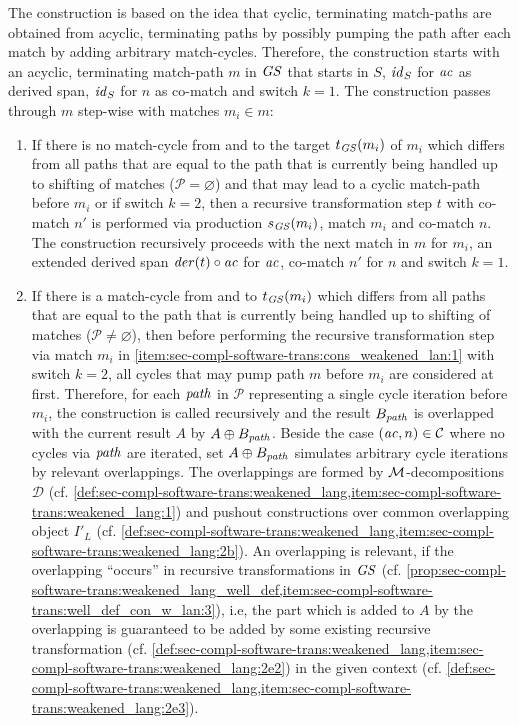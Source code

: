 \begin{remark}
\label{rem:sec-compl-software-trans:con_weakened_lang}
The construction is based on the idea that cyclic, terminating match-paths are obtained from acyclic, terminating paths by possibly pumping the path after each match by adding arbitrary match-cycles.
Therefore, the construction starts with an acyclic, terminating match-path $m$ in $\mathit{GS}$ that starts in $S$, $\mathit{id}_S$ for $\mathit{ac}$ as derived span, $\mathit{id}_S$ for $n$ as co-match and switch $k=1$.
The construction passes through $m$ step-wise with matches $m_i \in m$:
\begin{enumerate}
  \item \label{item:sec-compl-software-trans:cons_weakened_lan:1} If there is no match-cycle from and to the target $t_\mathit{GS}(m_i)$ of $m_i$ which differs from all paths that are equal to the path that is currently being handled up to shifting of matches ($\mathcal{P}=\varnothing$) and that may lead to a cyclic match-path before $m_i$ or if switch $k=2$, then a recursive transformation step $t$ with co-match $n'$ is performed via production $s_\mathit{GS}(m_i)$, match $m_i$ and co-match $n$.
  The construction recursively proceeds with the next match in $m$ for $m_i$, an extended derived span $\mathit{der}(t) \circ \mathit{ac}$ for $\mathit{ac}$, co-match $n'$ for $n$ and switch $k=1$.
  \item If there is a match-cycle from and to $t_\mathit{GS}(m_i)$ which differs from all paths that are equal to the path that is currently being handled up to shifting of matches ($\mathcal{P}\neq\varnothing$), then before performing the recursive transformation step via match $m_i$ in \cref{item:sec-compl-software-trans:cons_weakened_lan:1} with switch $k=2$, all cycles that may pump path $m$ before $m_i$ are considered at first.
  Therefore, for each $\mathit{path}$ in $\mathcal{P}$ representing a single cycle iteration before $m_i$, the construction is called recursively and the result $B_\mathit{path}$ is overlapped with the current result $A$ by $A \oplus B_\mathit{path}$.
  Beside the case $(\mathit{ac},n) \in \mathcal{C}$ where no cycles via $\mathit{path}$ are iterated, set $A \oplus B_\mathit{path}$ simulates arbitrary cycle iterations by relevant overlappings.
  The overlappings are formed by ${\cal M}$-decompositions $\mathcal{D}$ (cf. \cref{def:sec-compl-software-trans:weakened_lang,item:sec-compl-software-trans:weakened_lang:1}) and pushout constructions over common overlapping object $I'_L$ (cf. \cref{def:sec-compl-software-trans:weakened_lang,item:sec-compl-software-trans:weakened_lang:2b}).
  An overlapping is relevant, if the overlapping ``occurs'' in recursive transformations in $\mathit{GS}$ (cf. \cref{prop:sec-compl-software-trans:weakened_lang_well_def,item:sec-compl-software-trans:well_def_con_w_lan:3}), i.e, the part which is added to $A$ by the overlapping is guaranteed to be added by some existing recursive transformation (cf. \cref{def:sec-compl-software-trans:weakened_lang,item:sec-compl-software-trans:weakened_lang:2e2}) in the given context (cf. \cref{def:sec-compl-software-trans:weakened_lang,item:sec-compl-software-trans:weakened_lang:2e3}).

\end{enumerate}
\end{remark}
